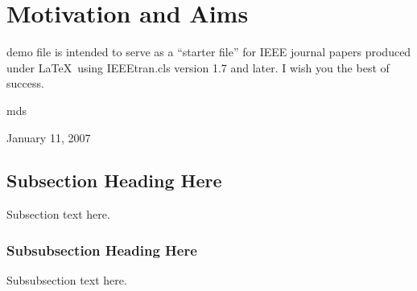 \section{Motivation and Aims} %
\label{sec:motivation_and_aims}
   demo file is intended to serve as a ``starter file''
  for IEEE journal papers produced under \LaTeX\ using
  IEEEtran.cls version 1.7 and later.
  I wish you the best of success.

  \hfill mds
 
  \hfill January 11, 2007

  \subsection{Subsection Heading Here}
  Subsection text here.


  \subsubsection{Subsubsection Heading Here}
  Subsubsection text here.



